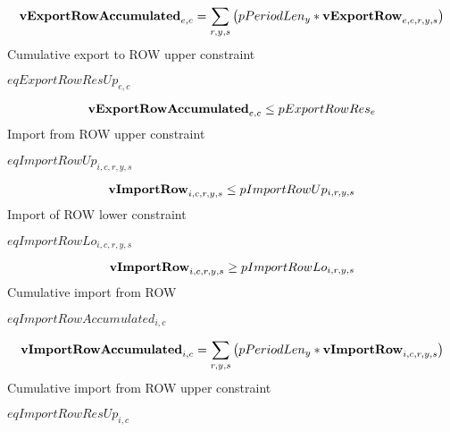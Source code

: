 \documentclass{article}
\begin{document}
\begin{dmath} 
{\bf vExportRowAccumulated}_{e,c}  =  \sum_{r,y,s}{\left(pPeriodLen_{y}*{\bf vExportRow}_{e,c,r,y,s}\right)}
\end{dmath} 
Cumulative export to ROW upper constraint







$eqExportRowResUp_{e,c}$





\begin{dmath} 
{\bf vExportRowAccumulated}_{e,c}  \le  pExportRowRes_{e}
\end{dmath} 
Import from ROW upper constraint







$eqImportRowUp_{i,c,r,y,s}$





\begin{dmath} 
{\bf vImportRow}_{i,c,r,y,s}  \le  pImportRowUp_{i,r,y,s}
\end{dmath} 
Import of ROW lower constraint







$eqImportRowLo_{i,c,r,y,s}$





\begin{dmath} 
{\bf vImportRow}_{i,c,r,y,s}  \ge  pImportRowLo_{i,r,y,s}
\end{dmath} 
Cumulative import from ROW







$eqImportRowAccumulated_{i,c}$





\begin{dmath} 
{\bf vImportRowAccumulated}_{i,c}  =  \sum_{r,y,s}{\left(pPeriodLen_{y}*{\bf vImportRow}_{i,c,r,y,s}\right)}
\end{dmath} 
Cumulative import from ROW upper constraint







$eqImportRowResUp_{i,c}$
\end{document}
